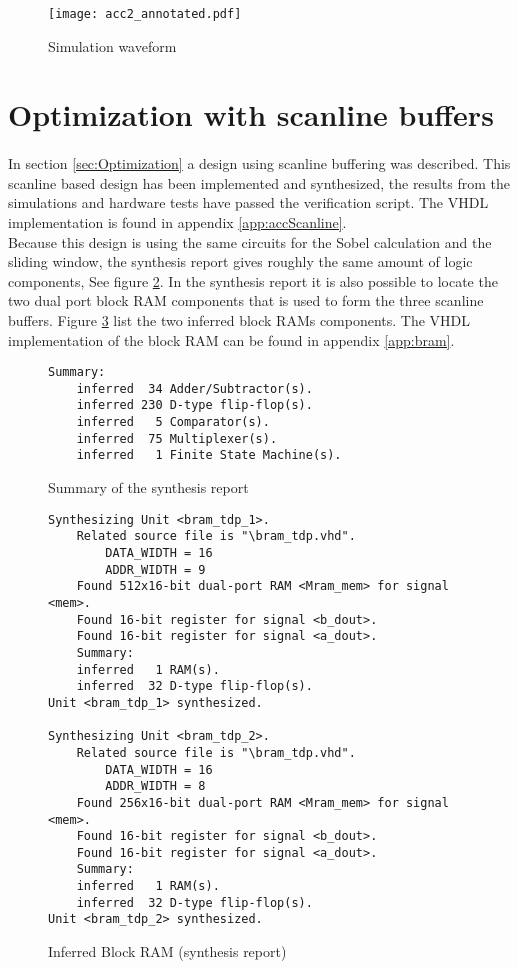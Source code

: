 \begin{figure}[H]
	\centering
    \texttt{[image: acc2\_annotated.pdf]}
	\caption{Simulation waveform}
	\label{fig:acc2_waveform}
\end{figure}


\section{Optimization with scanline buffers}
\paragraph*{}
In section \ref{sec:Optimization} a design using scanline buffering was described. This scanline based design has been implemented and synthesized, the results from the simulations and hardware tests have passed the verification script. The VHDL implementation is found in appendix \ref{app:accScanline}. \\
Because this design is using the same circuits for the Sobel calculation and the sliding window, the synthesis report gives roughly the same amount of logic components, See figure \ref{fig:sum_synthesis_report_scan}.
In the synthesis report it is also possible to locate the two dual port block RAM components that is used to form the three scanline buffers. Figure \ref{fig:sum_synthesis_report_ram} list the two inferred block RAMs components. The VHDL implementation of the block RAM can be found in appendix \ref{app:bram}.
    
\begin{figure}[H]
\centering
\small
\begin{BVerbatim}
Summary:
    inferred  34 Adder/Subtractor(s).
    inferred 230 D-type flip-flop(s).
    inferred   5 Comparator(s).
    inferred  75 Multiplexer(s).
    inferred   1 Finite State Machine(s).
\end{BVerbatim}
\caption{Summary of the synthesis report}
\label{fig:sum_synthesis_report_scan}
\end{figure}

\begin{figure}[H]
\centering
\small
\begin{BVerbatim}
Synthesizing Unit <bram_tdp_1>.
    Related source file is "\bram_tdp.vhd".
        DATA_WIDTH = 16
        ADDR_WIDTH = 9
    Found 512x16-bit dual-port RAM <Mram_mem> for signal <mem>.
    Found 16-bit register for signal <b_dout>.
    Found 16-bit register for signal <a_dout>.
    Summary:
	inferred   1 RAM(s).
	inferred  32 D-type flip-flop(s).
Unit <bram_tdp_1> synthesized.

Synthesizing Unit <bram_tdp_2>.
    Related source file is "\bram_tdp.vhd".
        DATA_WIDTH = 16
        ADDR_WIDTH = 8
    Found 256x16-bit dual-port RAM <Mram_mem> for signal <mem>.
    Found 16-bit register for signal <b_dout>.
    Found 16-bit register for signal <a_dout>.
    Summary:
	inferred   1 RAM(s).
	inferred  32 D-type flip-flop(s).
Unit <bram_tdp_2> synthesized.
\end{BVerbatim}
\caption{Inferred Block RAM (synthesis report)}
\label{fig:sum_synthesis_report_ram}
\end{figure}

